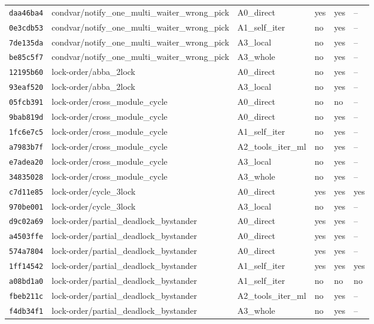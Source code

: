 \begin{tabular}{llllll}
\texttt{daa46ba4} & condvar/notify\_one\_multi\_waiter\_wrong\_pick & A0\_direct & yes & yes & -- \\
\texttt{0e3cdb53} & condvar/notify\_one\_multi\_waiter\_wrong\_pick & A1\_self\_iter & no & yes & -- \\
\texttt{7de135da} & condvar/notify\_one\_multi\_waiter\_wrong\_pick & A3\_local & no & yes & -- \\
\texttt{be85c5f7} & condvar/notify\_one\_multi\_waiter\_wrong\_pick & A3\_whole & no & yes & -- \\
\texttt{12195b60} & lock-order/abba\_2lock & A0\_direct & no & yes & -- \\
\texttt{93eaf520} & lock-order/abba\_2lock & A3\_local & no & yes & -- \\
\texttt{05fcb391} & lock-order/cross\_module\_cycle & A0\_direct & no & no & -- \\
\texttt{9bab819d} & lock-order/cross\_module\_cycle & A0\_direct & no & yes & -- \\
\texttt{1fc6e7c5} & lock-order/cross\_module\_cycle & A1\_self\_iter & no & yes & -- \\
\texttt{a7983b7f} & lock-order/cross\_module\_cycle & A2\_tools\_iter\_ml & no & yes & -- \\
\texttt{e7adea20} & lock-order/cross\_module\_cycle & A3\_local & no & yes & -- \\
\texttt{34835028} & lock-order/cross\_module\_cycle & A3\_whole & no & yes & -- \\
\texttt{c7d11e85} & lock-order/cycle\_3lock & A0\_direct & yes & yes & yes \\
\texttt{970be001} & lock-order/cycle\_3lock & A3\_local & no & yes & -- \\
\texttt{d9c02a69} & lock-order/partial\_deadlock\_bystander & A0\_direct & yes & yes & -- \\
\texttt{a4503ffe} & lock-order/partial\_deadlock\_bystander & A0\_direct & yes & yes & -- \\
\texttt{574a7804} & lock-order/partial\_deadlock\_bystander & A0\_direct & yes & yes & -- \\
\texttt{1ff14542} & lock-order/partial\_deadlock\_bystander & A1\_self\_iter & yes & yes & yes \\
\texttt{a08bd1a0} & lock-order/partial\_deadlock\_bystander & A1\_self\_iter & no & no & no \\
\texttt{fbeb211c} & lock-order/partial\_deadlock\_bystander & A2\_tools\_iter\_ml & no & yes & -- \\
\texttt{f4db34f1} & lock-order/partial\_deadlock\_bystander & A3\_whole & no & yes & -- \\

\end{tabular}
